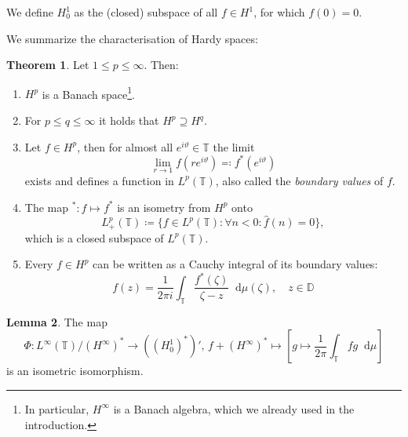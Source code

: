 \documentclass[letterpaper, 11pt]{article}
\newcommand{\D}{\mathbb{D}}
\newcommand{\T}{\mathbb{T}}
\newcommand{\1}{\mathds{1}}
\newcommand{\diff}{\mathop{}\!\mathrm{d}}
\theoremstyle{definition}
\newtheorem{theorem}{Theorem}
\newtheorem{lemma}[theorem]{Lemma}
\begin{document}
We define $H_0^1$ as the (closed) subspace of all $f \in H^1$, for which $f(0) = 0$.

We summarize the characterisation of Hardy spaces:
\begin{theorem} Let $1 \leq p \leq \infty$. Then:
  \begin{enumerate}
    \item $H^p$ is a Banach space\footnote{In particular, $H^\infty$ is a Banach algebra, which we already used in the introduction.}.
    \item For $p \leq q \leq \infty$ it holds that $H^p \supseteq H^q$.
    \item Let $f \in H^p$, then for almost all $e^{i \vartheta} \in \T$ the limit
    $$ \lim_{r \to 1} f(re^{i \vartheta}) \eqqcolon f^*(e^{i \vartheta}) $$
    exists and defines a function in $L^p(\T)$, also called the \emph{boundary values} of $f$.
    \item The map ${}^* : f \mapsto f^*$ is an isometry from $H^p$ onto
    $$ L^p_+(\T) \coloneqq \{ f \in L^p(\T) : \forall n < 0: \hat{f}(n) = 0 \}, $$
    which is a closed subspace of $L^p(\T)$.
    \item Every $f \in H^p$ can be written as a Cauchy integral of its boundary values:
    $$ f(z) = \frac{1}{2 \pi i} \int_\T \frac{f^*(\zeta)}{\zeta - z} \diff \mu(\zeta), \quad z \in \D $$
  \end{enumerate}
\end{theorem}

\begin{lemma}
  The map
  \begin{equation*}
    \Phi : L^\infty(\T) / (H^\infty)^* \to ((H_0^1)^*)',\, f + (H^\infty)^* \mapsto \left[ g \mapsto \frac{1}{2 \pi} \int_\T f g \diff \mu \right]
  \end{equation*}
  is an isometric isomorphism.
\end{lemma}
\end{document}
